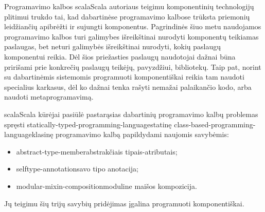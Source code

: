 Programavimo kalbos \gls{scala}{Scala} autoriaus  teigimu komponentinių technologijų plitimui trukdo
tai, kad dabartinėse programavimo kalbose trūksta priemonių leidžiančių
apibrėžti ir sujungti komponentus\cite{odersky:scala-experiment}.
Pagrindinės šiuo metu naudojamos programavimo kalbos turi galimybes
išreikštinai nurodyti komponentų teikiamas paslaugas, bet neturi
galimybės išreikštinai nurodyti, kokių paslaugų
komponentui reikia. Dėl šios priežasties paslaugų naudotojai dažnai
būna pririšami prie konkrečių paslaugų teikėjų, pavyzdžiui,
bibliotekų\cite{scalable-component-abstractions}. Taip pat, norint
su dabartinėmis sistemomis programuoti komponentiškai reikia
tam naudoti specialius karkasus, dėl ko dažnai tenka rašyti
nemažai palaikančio  kodo, arba naudoti
metaprogramavimą\cite{extensible-software-components}.

\gls{scala}{Scala} kūrėjai pasiūlė pastarąsias dabartinių programavimo
kalbų problemas spręsti
\gls{statically-typed-programming-language}{statinę}
\gls{class-based-programming-language}{klasinę}
 programavimo kalbą papildydami naujomis
savybėmis\cite{scalable-component-abstractions}:
\begin{itemize}
  \item \gls{abstract-type-member}{abstrakčiais tipais-atributais};
  \item \gls{selftype-annotation}{savo tipo anotacija};
  \item \gls{modular-mixin-composition}{moduline maišos kompozicija}.
\end{itemize}
Jų teigimu\cite[1]{scalable-component-abstractions} šių trijų savybių
pridėjimas įgalina programuoti komponentiškai.

